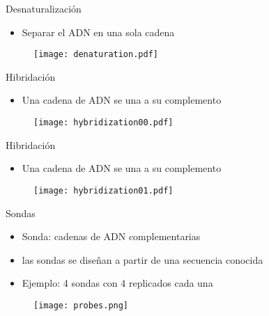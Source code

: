 \documentclass{beamer}
\begin{document}
\begin{frame}{Desnaturalización}
\begin{itemize}
\item Separar el ADN en una sola cadena
\end{itemize}
\begin{figure}[H]
\centering
\texttt{[image: denaturation.pdf]}
\end{figure}
\end{frame}

\begin{frame}{Hibridación}
\begin{itemize}
\item Una cadena de ADN se una a su complemento
\end{itemize}
\begin{figure}[H]
\centering
\texttt{[image: hybridization00.pdf]}
\end{figure}
\end{frame}


\begin{frame}{Hibridación}
\begin{itemize}
\item Una cadena de ADN se una a su complemento
\end{itemize}
\begin{figure}[H]
\centering
\texttt{[image: hybridization01.pdf]}
\end{figure}
\end{frame}



\begin{frame}{Sondas}
\begin{itemize}
\item Sonda: cadenas de ADN complementarias
\item las sondas se diseñan a partir de una secuencia conocida
\item Ejemplo: 4 sondas con 4 replicados cada una
\end{itemize}
\begin{figure}[H]
\centering
\texttt{[image: probes.png]}
\end{figure}
\end{frame}
\end{document}

